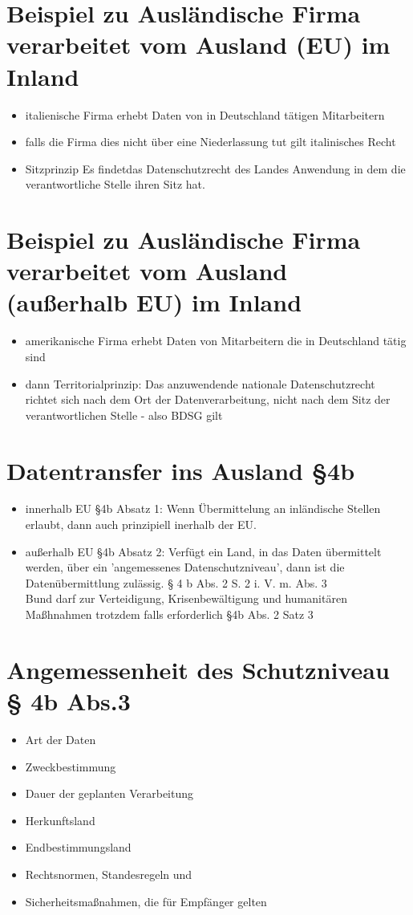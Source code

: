 \documentclass[a4paper,10pt]{scrartcl}
\begin{document}
\section{Beispiel zu Ausländische Firma verarbeitet vom Ausland (EU) im Inland }
\begin{itemize}
 \item italienische Firma erhebt Daten von in Deutschland tätigen Mitarbeitern
 \item falls die Firma dies nicht über eine Niederlassung tut gilt italinisches
 Recht
 \item Sitzprinzip Es findetdas Datenschutzrecht des Landes Anwendung in dem die
 verantwortliche Stelle ihren Sitz hat.
\end{itemize}
\section{Beispiel zu Ausländische Firma verarbeitet vom Ausland (außerhalb EU) im Inland }
\begin{itemize}
 \item amerikanische Firma erhebt Daten von Mitarbeitern die in Deutschland tätig sind
 \item dann Territorialprinzip: Das anzuwendende nationale Datenschutzrecht richtet sich 
nach dem Ort der Datenverarbeitung, nicht nach dem Sitz 
der verantwortlichen Stelle - also BDSG gilt
\end{itemize}
\section{Datentransfer ins Ausland §4b}

\begin{itemize}
 \item innerhalb EU §4b Absatz 1: Wenn Übermittelung an inländische Stellen erlaubt, dann auch prinzipiell inerhalb der EU.
 \item außerhalb EU §4b Absatz 2: Verfügt ein Land, in das Daten übermittelt werden, über ein 
'angemessenes Datenschutzniveau', dann ist die  
Datenübermittlung zulässig. § 4 b Abs. 2 S. 2 i. V. m. Abs. 3
\\ Bund darf zur Verteidigung, Krisenbewältigung und humanitären Maßhnahmen trotzdem 
falls erforderlich §4b Abs. 2 Satz 3
\end{itemize}

\section{Angemessenheit des Schutzniveau § 4b Abs.3}
\begin{itemize}
 \item Art der Daten
 \item Zweckbestimmung
 \item Dauer der geplanten Verarbeitung
 \item Herkunftsland
 \item Endbestimmungsland
 \item Rechtsnormen, Standesregeln und 
 \item Sicherheitsmaßnahmen, die für Empfänger gelten 
\end{itemize}
\end{document}
